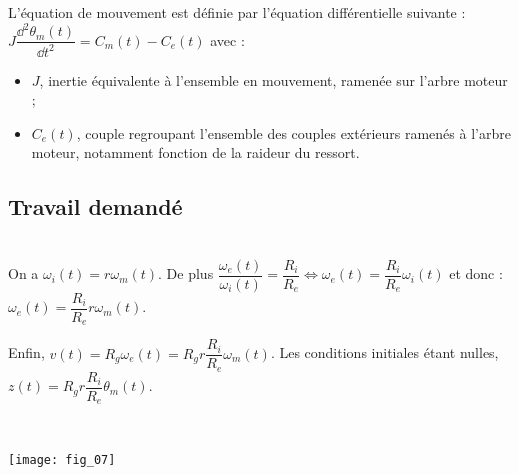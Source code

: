 L’équation de mouvement est définie par l’équation différentielle suivante : $J\dfrac{\dd^2 \theta_m(t)}{\dd t^2}=C_m(t)-C_e(t)$  avec :
\begin{itemize}
\item $J$, inertie équivalente à l’ensemble en mouvement, ramenée sur l’arbre moteur ;
\item $C_e(t)$, couple regroupant l’ensemble des couples extérieurs ramenés à l’arbre moteur, notamment fonction de la raideur du ressort.
\end{itemize}

\fi


\subsection*{Travail demandé}


\ifprof
\begin{corrige} ~\\
On a $\omega_i(t) = r\omega_m(t)$. De plus $\dfrac{\omega_e(t)}{\omega_i(t)}=\dfrac{R_i}{R_e} \Longleftrightarrow \omega_e(t)=\dfrac{R_i}{R_e}\omega_i(t)$ et donc :
$\omega_e(t)=\dfrac{R_i}{R_e}r\omega_m(t)$.

Enfin, $v(t)=R_g \omega_e(t) =R_g r \dfrac{R_i}{R_e}\omega_m(t)$. Les conditions initiales étant nulles, $z(t)=R_g r \dfrac{R_i}{R_e}\theta_m(t)$. 
\end{corrige}
\else
\fi


\ifprof
\begin{corrige} ~\\
\begin{center}
\texttt{[image: fig\_07]}
\end{center}

\end{corrige}
\else
\fi

